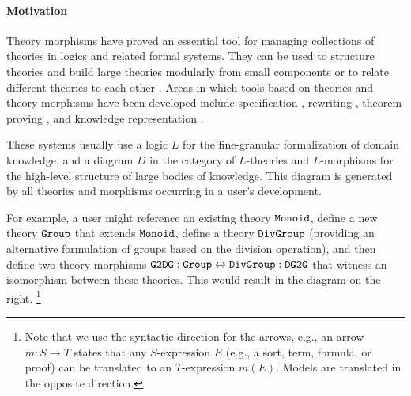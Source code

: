 \paragraph{Motivation}
Theory morphisms have proved an essential tool for managing collections of theories in logics and related formal systems.
They can be used to structure theories and build large theories modularly from small components or to relate different theories to each other \cite{asl,devgraphs,littletheories}.
Areas in which tools based on theories and theory morphisms have been developed include specification \cite{obj,hets}, rewriting \cite{maude}, theorem proving \cite{imps}, and knowledge representation \cite{RK:mmt:10}.


These systems usually use a logic $L$ for the fine-granular formalization of domain knowledge, and a diagram $D$ in the category of $L$-theories and $L$-morphisms for the high-level structure of large bodies of knowledge.
This diagram is generated by all theories and morphisms occurring in a user's development.

\begin{wrapfigure}{r}{5.5cm}
\vspace{-3em}
\vspace{-3.5em}
\end{wrapfigure}

For example, a user might reference an existing theory $\operatorname{\mathtt{Monoid}}$, define a new theory $\operatorname{\mathtt{Group}}$ that extends $\operatorname{\mathtt{Monoid}}$, define a theory $\operatorname{\mathtt{DivGroup}}$ (providing an alternative formulation of groups based on the division operation), and then define two theory morphisms $\operatorname{\mathtt{G2DG}}:\operatorname{\mathtt{Group}}\leftrightarrow \operatorname{\mathtt{DivGroup}}:\operatorname{\mathtt{DG2G}}$ that witness an isomorphism between these theories.
This would result in the diagram on the right.%
\footnote{Note that we use the syntactic direction for the arrows, e.g., an arrow $m:S\to T$ states that any $S$-expression $E$ (e.g., a sort, term, formula, or proof) can be translated to an $T$-expression $m(E)$. Models are translated in the opposite direction.}

